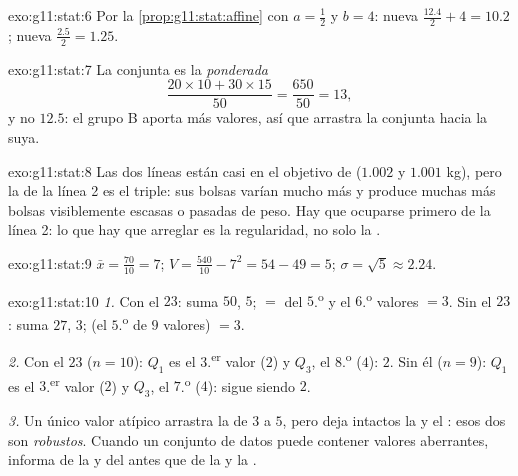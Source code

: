 \begin{solution}{exo:g11:stat:6}
Por la \cref{prop:g11:stat:affine} con $a = \frac12$ y $b = 4$: nueva
 $\frac{12.4}{2} + 4 = 10.2$; nueva 
$\frac{2.5}{2} = 1.25$.
\end{solution}

\begin{solution}{exo:g11:stat:7}
La  conjunta es la  \emph{ponderada}
\[
\frac{20 \times 10 + 30 \times 15}{50} = \frac{650}{50} = 13,
\]
y no $12.5$: el grupo B aporta más valores, así que arrastra la 
conjunta hacia la suya.
\end{solution}

\begin{solution}{exo:g11:stat:8}
Las dos líneas están casi en el objetivo de  ($1.002$ y $1.001$ kg),
pero la  de la línea 2 es el triple: sus bolsas varían
mucho más y produce muchas más bolsas visiblemente escasas o pasadas de
peso. Hay que ocuparse primero de la línea 2: lo que hay que arreglar es
la regularidad, no solo la .
\end{solution}

\begin{solution}{exo:g11:stat:9}
$\bar x = \frac{70}{10} = 7$; $V = \frac{540}{10} - 7^2 = 54 - 49 = 5$;
$\sigma = \sqrt5 \approx 2.24$.
\end{solution}

\begin{solution}{exo:g11:stat:10}
\emph{1.} Con el $23$: suma $50$,  $5$;  $=$  del
$5$.\textsuperscript{o} y el $6$.\textsuperscript{o} valores $= 3$. Sin el
$23$: suma $27$,  $3$;  (el $5$.\textsuperscript{o} de $9$
valores) $= 3$.

\emph{2.} Con el $23$ ($n = 10$): $Q_1$ es el $3$.\textsuperscript{er}
valor ($2$) y $Q_3$, el $8$.\textsuperscript{o} ($4$):  $2$. Sin él ($n = 9$): $Q_1$ es el
$3$.\textsuperscript{er} valor ($2$) y $Q_3$, el $7$.\textsuperscript{o}
($4$): sigue siendo $2$.

\emph{3.} Un único valor atípico arrastra la  de $3$ a $5$, pero deja
intactos la  y el : esos dos son
\emph{robustos}. Cuando un conjunto de datos puede contener valores
aberrantes, informa de la  y del  antes
que de la  y la .
\end{solution}

